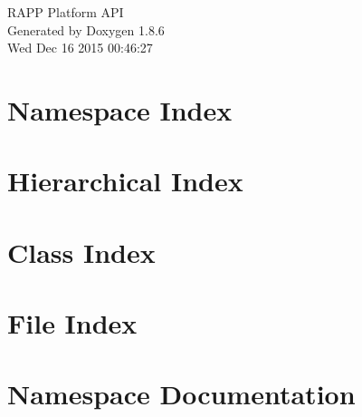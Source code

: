 \documentclass[twoside]{book}
\newcommand{\clearemptydoublepage}{%
  \newpage{\pagestyle{empty}\cleardoublepage}%
}
\begin{document}
\hypersetup{pageanchor=false}
\begin{titlepage}
\vspace*{7cm}
\begin{center}%
{\Large R\-A\-P\-P Platform A\-P\-I }\\
\vspace*{1cm}
{\large Generated by Doxygen 1.8.6}\\
\vspace*{0.5cm}
{\small Wed Dec 16 2015 00:46:27}\\
\end{center}
\end{titlepage}
\clearemptydoublepage
\tableofcontents
\clearemptydoublepage
{}
\hypersetup{pageanchor=true}

\chapter{Namespace Index}

\chapter{Hierarchical Index}

\chapter{Class Index}

\chapter{File Index}

\chapter{Namespace Documentation}












\end{document}
